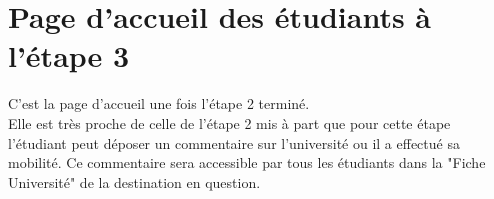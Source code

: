 \section{Page d'accueil des étudiants à l'étape 3}
C'est la page d'accueil une fois l'étape 2 terminé.\\
Elle est très proche de celle de l'étape 2 mis à part que pour cette étape l'étudiant peut déposer un commentaire sur l'université ou il a effectué sa mobilité. Ce commentaire sera accessible par tous les étudiants dans la "Fiche Université" de la destination en question.